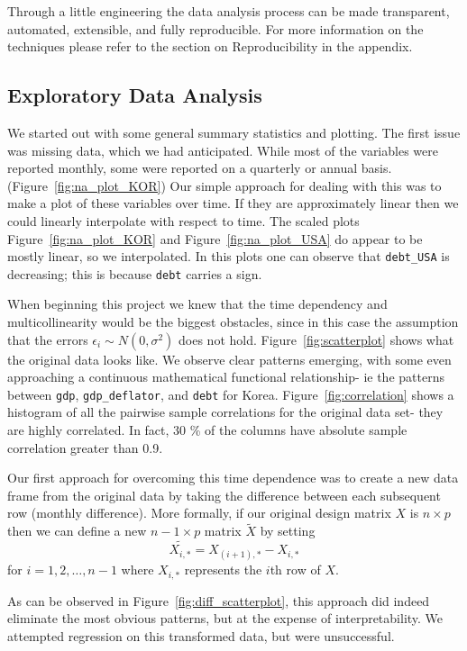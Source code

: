 \documentclass[12pt]{article}
\begin{document}
Through a little engineering the data analysis process
can be made transparent, automated, extensible, and fully reproducible.
For more information on the techniques please refer to the section on
Reproducibility in the appendix.

\subsection{Exploratory Data Analysis}

We started out with some general summary statistics and plotting. The first
issue was missing data, which we had anticipated. While most of the
variables were reported monthly, some were reported on a quarterly or
annual basis. (Figure~\ref{fig:na_plot_KOR})
Our simple approach for dealing with this was to
make a plot of these variables over time.
If they are approximately linear then we could 
linearly interpolate with respect to time. The scaled plots 
Figure~\ref{fig:na_plot_KOR} and
Figure~\ref{fig:na_plot_USA} do appear to be mostly linear, so we interpolated. 
In this plots one can observe that \texttt{debt\_USA} is decreasing; this is
because \texttt{debt} carries a sign.

When beginning this project we knew that the time dependency and
multicollinearity would be the
biggest obstacles, since in this case the assumption that the errors
$\epsilon_i \sim N(0, \sigma^2)$ does not hold.
Figure~\ref{fig:scatterplot} shows what the original data looks like.
We observe clear patterns emerging, with some even approaching a
continuous mathematical functional relationship- ie the patterns
between \texttt{gdp}, \texttt{gdp\_deflator}, and \texttt{debt} for Korea.
Figure~\ref{fig:correlation} shows a histogram of all the pairwise sample
correlations for the original data set- they are highly correlated. In
fact, 30 \% of the columns have absolute sample correlation greater than 0.9.

Our first approach for overcoming this time dependence was to create a new
data frame from the original data by taking the difference between each
subsequent row (monthly difference). 
More formally, if our original design matrix $X$ is $n
\times p$ then we can define a new $n - 1 \times p$ matrix $\tilde{X}$ by
setting
\[
    \tilde{X_{i,*}} = X_{(i + 1), *} - X_{i, *}
\]
for $i = 1, 2, \dots, n-1$ where $X_{i, *}$ represents the $i$th row of
$X$.

As can be observed in Figure~\ref{fig:diff_scatterplot},
this approach did indeed eliminate the most obvious patterns, but 
at the expense of interpretability. We attempted regression on this
transformed data, but were unsuccessful.
\end{document}
